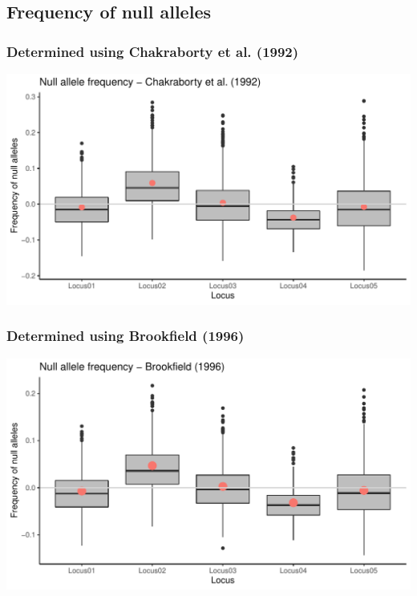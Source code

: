 \documentclass[a4paper]{scrartcl}\usepackage[]{graphicx}\usepackage[]{color}
\makeatletter
\def\maxwidth{ %
  \ifdim\Gin@nat@width>\linewidth
    \linewidth
  \else
    \Gin@nat@width
  \fi
}
\newenvironment{knitrout}{}{} %
\makeatother
\begin{document}
\FloatBarrier

\subsection{Frequency of null alleles}
\subsubsection{Determined using Chakraborty et al. (1992)}


\begin{knitrout}
\color{fgcolor}
\includegraphics[width=\maxwidth]{PopGenReport-null_all_Chakraborty-1} 

\end{knitrout}




\subsubsection{Determined using Brookfield (1996)}


\begin{knitrout}
\color{fgcolor}
\includegraphics[width=\maxwidth]{PopGenReport-null_all_Brookfield-1} 

\end{knitrout}
\end{document}
